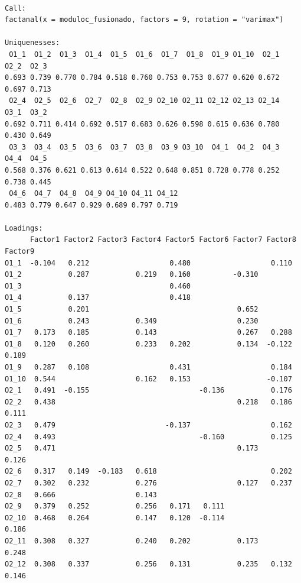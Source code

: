 \documentclass[
  letterpaper,
  DIV=11,
  numbers=noendperiod]{scrartcl}
\begin{document}
\begin{verbatim}

Call:
factanal(x = moduloc_fusionado, factors = 9, rotation = "varimax")

Uniquenesses:
 O1_1  O1_2  O1_3  O1_4  O1_5  O1_6  O1_7  O1_8  O1_9 O1_10  O2_1  O2_2  O2_3 
0.693 0.739 0.770 0.784 0.518 0.760 0.753 0.753 0.677 0.620 0.672 0.697 0.713 
 O2_4  O2_5  O2_6  O2_7  O2_8  O2_9 O2_10 O2_11 O2_12 O2_13 O2_14  O3_1  O3_2 
0.692 0.711 0.414 0.692 0.517 0.683 0.626 0.598 0.615 0.636 0.780 0.430 0.649 
 O3_3  O3_4  O3_5  O3_6  O3_7  O3_8  O3_9 O3_10  O4_1  O4_2  O4_3  O4_4  O4_5 
0.568 0.376 0.621 0.613 0.614 0.522 0.648 0.851 0.728 0.778 0.252 0.738 0.445 
 O4_6  O4_7  O4_8  O4_9 O4_10 O4_11 O4_12 
0.483 0.779 0.647 0.929 0.689 0.797 0.719 

Loadings:
      Factor1 Factor2 Factor3 Factor4 Factor5 Factor6 Factor7 Factor8 Factor9
O1_1  -0.104   0.212                   0.480                   0.110         
O1_2           0.287           0.219   0.160          -0.310                 
O1_3                                   0.460                                 
O1_4           0.137                   0.418                                 
O1_5           0.201                                   0.652                 
O1_6           0.243           0.349                   0.230                 
O1_7   0.173   0.185           0.143                   0.267   0.288         
O1_8   0.120   0.260           0.233   0.202           0.134  -0.122   0.189 
O1_9   0.287   0.108                   0.431                   0.184         
O1_10  0.544                   0.162   0.153                  -0.107         
O2_1   0.491  -0.155                          -0.136           0.176         
O2_2   0.438                                           0.218   0.186   0.111 
O2_3   0.479                          -0.137                   0.162         
O2_4   0.493                                  -0.160           0.125         
O2_5   0.471                                           0.173           0.126 
O2_6   0.317   0.149  -0.183   0.618                           0.202         
O2_7   0.302   0.232           0.276                   0.127   0.237         
O2_8   0.666                   0.143                                         
O2_9   0.379   0.252           0.256   0.171   0.111                         
O2_10  0.468   0.264           0.147   0.120  -0.114                   0.186 
O2_11  0.308   0.327           0.240   0.202           0.173           0.248 
O2_12  0.308   0.337           0.256   0.131           0.235   0.132   0.146 

\end{verbatim}
\end{document}
